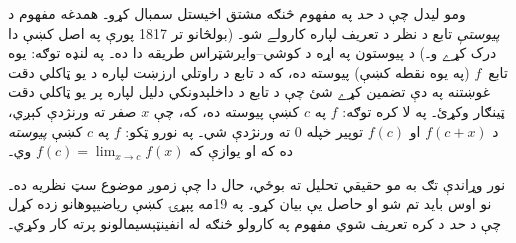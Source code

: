 \documentclass[../../../include/open-logic-section]{subfiles}
\begin{document}
ومو ليدل چې د \emph{حد} په مفهوم څنګه مشتق اخيستل سمبال کړو۔ همدغه مفهوم د \emph{پيوستې} تابع د نظر د تعريف لپاره کارولے شو۔ (بولڅانو تر 1817 پورې په اصل کښې دا درک کړے و۔) د پيوستون په اړه د کوشي--وايرشټراس طريقه دا ده۔ په لنډه توګه: يوه تابع~$f$ (په يوه نقطه کښې) پيوسته ده، که د تابع د راوتلي ارزښت لپاره د يو ټاکلي دقت غوښتنه په دې تضمين کړے شئ چې د تابع د داخلېدونکي دليل لپاره پر يو ټاکلي دقت ټينګار وکړئ۔ په لا کره توګه: $f$ په $c$ کښې پيوسته ده، که، چې $x$ صفر ته ورنژدې کېږي، د $f(c + x)$ او $f(c)$ توپير خپله $0$ ته ورنژدې شي۔ په نورو ټکو: $f$ په $c$ کښې \emph{پيوسته} ده که او يوازې که $f(c) = \lim_{x \rightarrow c} f(x)$ وي۔

نور وړاندې تګ به مو حقيقي تحليل ته بوځي، حال دا چې زموږ موضوع سټ نظريه ده۔ نو اوس بايد تم شو او حاصل يې بيان کړو۔ په 19مه پېړۍ کښې رياضيپوهانو زده کړل چې د \emph{حد} د کره تعريف شوي مفهوم په کارولو څنګه له انفينټېسيمالونو پرته کار وکړي۔
\end{document}
